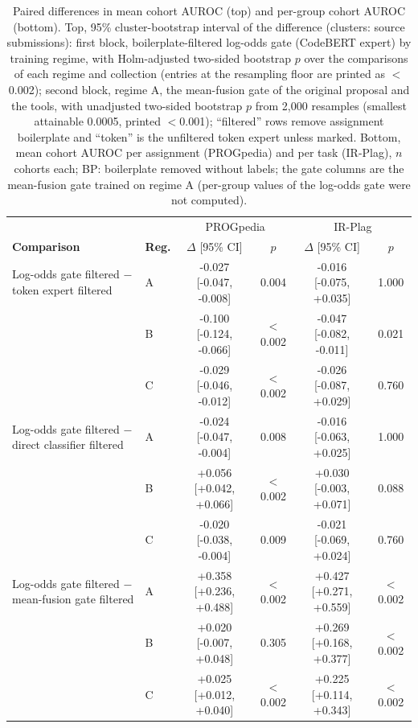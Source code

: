 \begin{table}[t]
\centering
\caption{Paired differences in mean cohort AUROC (top) and per-group cohort AUROC (bottom). Top, 95\% cluster-bootstrap interval of the difference (clusters: source submissions): first block, boilerplate-filtered log-odds gate (CodeBERT expert) by training regime, with Holm-adjusted two-sided bootstrap $p$ over the comparisons of each regime and collection (entries at the resampling floor are printed as $<$0.002); second block, regime A, the mean-fusion gate of the original proposal and the tools, with unadjusted two-sided bootstrap $p$ from 2,000 resamples (smallest attainable 0.0005, printed $<$0.001); ``filtered'' rows remove assignment boilerplate and ``token'' is the unfiltered token expert unless marked. Bottom, mean cohort AUROC per assignment (PROGpedia) and per task (IR-Plag), $n$ cohorts each; BP: boilerplate removed without labels; the gate columns are the mean-fusion gate trained on regime A (per-group values of the log-odds gate were not computed).}
\label{tab:cohort-filt-diff}
\scriptsize
\setlength{\tabcolsep}{3pt}
\begin{tabular}{ll|cc|cc}
\toprule
 & & \multicolumn{2}{c|}{PROGpedia} & \multicolumn{2}{c}{IR-Plag} \\
\textbf{Comparison} & \textbf{Reg.} & $\Delta$ [95\% CI] & $p$ & $\Delta$ [95\% CI] & $p$ \\
\midrule
Log-odds gate filtered $-$ token expert filtered & A & -0.027 [-0.047, -0.008] & 0.004 & -0.016 [-0.075, +0.035] & 1.000 \\
 & B & -0.100 [-0.124, -0.066] & $<$0.002 & -0.047 [-0.082, -0.011] & 0.021 \\
 & C & -0.029 [-0.046, -0.012] & $<$0.002 & -0.026 [-0.087, +0.029] & 0.760 \\
\midrule
Log-odds gate filtered $-$ direct classifier filtered & A & -0.024 [-0.047, -0.004] & 0.008 & -0.016 [-0.063, +0.025] & 1.000 \\
 & B & +0.056 [+0.042, +0.066] & $<$0.002 & +0.030 [-0.003, +0.071] & 0.088 \\
 & C & -0.020 [-0.038, -0.004] & 0.009 & -0.021 [-0.069, +0.024] & 0.760 \\
\midrule
Log-odds gate filtered $-$ mean-fusion gate filtered & A & +0.358 [+0.236, +0.488] & $<$0.002 & +0.427 [+0.271, +0.559] & $<$0.002 \\
 & B & +0.020 [-0.007, +0.048] & 0.305 & +0.269 [+0.168, +0.377] & $<$0.002 \\
 & C & +0.025 [+0.012, +0.040] & $<$0.002 & +0.225 [+0.114, +0.343] & $<$0.002 \\

\end{tabular}
\end{table}
